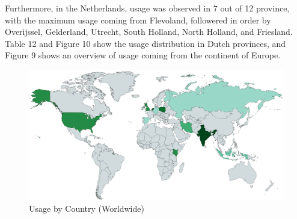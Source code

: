 \documentclass{article}
\begin{document}
Furthermore, in the Netherlands, usage was observed in 7 out of 12 province, with the maximum usage coming from Flevoland, followered in order by Overijssel, Gelderland, Utrecht, South Holland, North Holland, and Friesland. Table 12 and Figure 10 show the usage distribution in Dutch provinces, and Figure 9 shows an overview of usage coming from the continent of Europe.

\begin{figure}
	\includegraphics[width=\textwidth]{location-world.png}
	\caption{Usage by Country (Worldwide)}
\end{figure}
\end{document}
